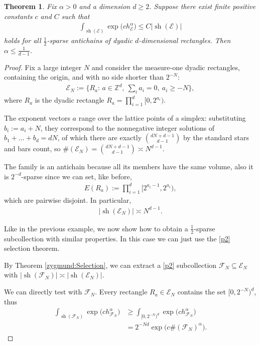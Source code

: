 \documentclass[oneside]{amsart}
\newtheorem{theorem}{Theorem}
\theoremstyle{definition}
\theoremstyle{plain}
\numberwithin{equation}{section}
\numberwithin{theorem}{section}
\newcommand{\sh}{\operatorname{sh}}
\begin{document}
\begin{theorem} \label{sharpness:simplex}
  Fix $\alpha > 0$ and a dimension $d \geq 2$.
  Suppose there exist finite positive
  constants $c$ and $C$ such that
  \begin{align*}
    \int_{\sh(\mathcal{E})} \exp\big( c h_{\mathcal{E}}^\alpha \big)
    \leq C |\sh(\mathcal{E})|
  \end{align*}
  holds for all $\frac{1}{2}$-sparse antichains of dyadic $d$-dimensional
  rectangles. Then $\alpha \leq \frac{1}{d-1}$.
\end{theorem}
\begin{proof}
  Fix a large integer $N$ and consider the measure-one dyadic rectangles,
  containing the origin, and with no side shorter than $2^{-N}$:
  \begin{align*}
    \mathcal{E}_N := \Big\{ R_a:\,
      a \in \mathbb{Z}^d, \ \textstyle\sum_i a_i = 0, \ a_i \geq -N \Big\},
  \end{align*}
  where $R_a$ is the dyadic rectangle $R_a = \prod_{i=1}^d [0,2^{a_i})$.

  The exponent vectors $a$ range over the lattice points of a simplex:
  substituting $b_i := a_i + N$, they correspond to the nonnegative integer
  solutions of $b_1 + \dots + b_d = dN$, of which there are exactly
  $\binom{dN+d-1}{d-1}$ by the standard stars and bars count, so
  $\#(\mathcal{E}_N) = \binom{dN+d-1}{d-1} \asymp N^{d-1}$.

  The family is an antichain because all its members have the same volume,
  also it is $2^{-d}$-sparse since we can set, like before,
  \begin{align*}
    E(R_a) := \prod_{i=1}^d [2^{a_i-1}, 2^{a_i}),
  \end{align*}
  which are pairwise disjoint.
  In particular,
  \begin{align} \label{example:shadow}
    |\sh(\mathcal{E}_N)| \asymp N^{d-1}.
  \end{align}

  Like in the previous example, we now show how to obtain a
  $\frac{1}{2}$-sparse subcollection with similar properties.
  In this case we can just use the \eqref{p2} selection theorem.

  By Theorem \ref{zygmund:Selection}, we can extract a \eqref{p2} subcollection
  $\mathcal{F}_N \subseteq \mathcal{E}_N$ with
  $|\sh(\mathcal{F}_N)| \asymp |\sh(\mathcal{E}_N)|$.

  We can directly test with $\mathcal{F}_N$.
  Every rectangle $R_a \in
  \mathcal{E}_N$ contains the set $[0,2^{-N})^d$, thus
  \begin{align*}
    \int_{\sh(\mathcal{F}_N)} \exp\big(c h_{\mathcal{F}_N}^\alpha \big)
    &\geq \int_{[0,2^{-N})^d} \exp\big(c h_{\mathcal{F}_N}^\alpha \big) \\
    &= 2^{-Nd} \exp\big(c \#(\mathcal{F}_N)^\alpha \big).
  \end{align*}


\end{proof}
\end{document}
